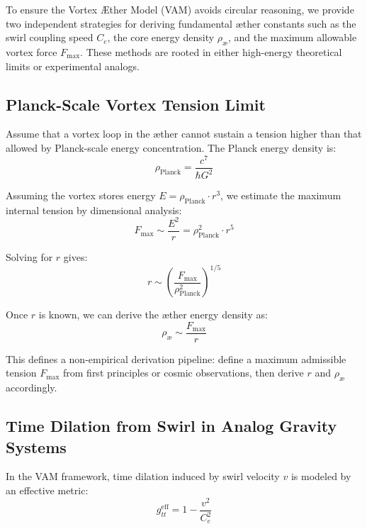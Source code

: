         To ensure the Vortex Æther Model (VAM) avoids circular reasoning, we provide two independent strategies for deriving fundamental æther constants such as the swirl coupling speed $C_e$, the core energy density $\rho_{\text{æ}}$, and the maximum allowable vortex force $F_{\max}$. These methods are rooted in either high-energy theoretical limits or experimental analogs.

        \subsection{ Planck-Scale Vortex Tension Limit}

        Assume that a vortex loop in the æther cannot sustain a tension higher than that allowed by Planck-scale energy concentration. The Planck energy density is:
        \begin{equation}
            \rho_{\text{Planck}} = \frac{c^7}{\hbar G^2}
        \end{equation}

        Assuming the vortex stores energy $E = \rho_{\text{Planck}} \cdot r^3$, we estimate the maximum internal tension by dimensional analysis:
        \begin{equation}
            F_{\max} \sim \frac{E^2}{r} = \rho_{\text{Planck}}^2 \cdot r^5
        \end{equation}

        Solving for $r$ gives:
        \begin{equation}
            r \sim \left( \frac{F_{\max}}{\rho_{\text{Planck}}^2} \right)^{1/5}
        \end{equation}

        Once $r$ is known, we can derive the æther energy density as:
        \begin{equation}
            \rho_{\text{æ}} \sim \frac{F_{\max}}{r}
        \end{equation}

        This defines a non-empirical derivation pipeline: define a maximum admissible tension $F_{\max}$ from first principles or cosmic observations, then derive $r$ and $\rho_{\text{æ}}$ accordingly.

        \subsection{ Time Dilation from Swirl in Analog Gravity Systems}

        In the VAM framework, time dilation induced by swirl velocity $v$ is modeled by an effective metric:
        \begin{equation}
            g_{tt}^{\text{eff}} = 1 - \frac{v^2}{C_e^2}
        \end{equation}

